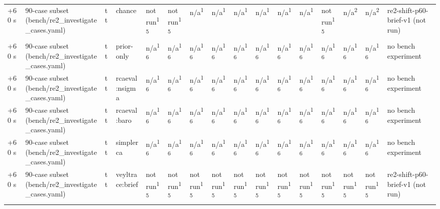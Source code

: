 \begin{table}[t]
\begin{tabular}{llllllllllllllll}
+60 s & 90-case subset (bench/re2\_investigate\_cases.yaml) & tt & chance & not run\textsuperscript{15} & not run\textsuperscript{15} & n/a\textsuperscript{1} & n/a\textsuperscript{1} & n/a\textsuperscript{1} & n/a\textsuperscript{1} & n/a\textsuperscript{1} & n/a\textsuperscript{1} & not run\textsuperscript{15} & n/a\textsuperscript{2} & n/a\textsuperscript{2} & re2-shift-p60-brief-v1 (not run) \\
+60 s & 90-case subset (bench/re2\_investigate\_cases.yaml) & tt & prior-only & n/a\textsuperscript{16} & n/a\textsuperscript{16} & n/a\textsuperscript{16} & n/a\textsuperscript{16} & n/a\textsuperscript{16} & n/a\textsuperscript{16} & n/a\textsuperscript{16} & n/a\textsuperscript{16} & n/a\textsuperscript{16} & n/a\textsuperscript{16} & n/a\textsuperscript{16} & no bench experiment \\
+60 s & 90-case subset (bench/re2\_investigate\_cases.yaml) & tt & rcaeval:nsigma & n/a\textsuperscript{16} & n/a\textsuperscript{16} & n/a\textsuperscript{16} & n/a\textsuperscript{16} & n/a\textsuperscript{16} & n/a\textsuperscript{16} & n/a\textsuperscript{16} & n/a\textsuperscript{16} & n/a\textsuperscript{16} & n/a\textsuperscript{16} & n/a\textsuperscript{16} & no bench experiment \\
+60 s & 90-case subset (bench/re2\_investigate\_cases.yaml) & tt & rcaeval:baro & n/a\textsuperscript{16} & n/a\textsuperscript{16} & n/a\textsuperscript{16} & n/a\textsuperscript{16} & n/a\textsuperscript{16} & n/a\textsuperscript{16} & n/a\textsuperscript{16} & n/a\textsuperscript{16} & n/a\textsuperscript{16} & n/a\textsuperscript{16} & n/a\textsuperscript{16} & no bench experiment \\
+60 s & 90-case subset (bench/re2\_investigate\_cases.yaml) & tt & simplerca & n/a\textsuperscript{16} & n/a\textsuperscript{16} & n/a\textsuperscript{16} & n/a\textsuperscript{16} & n/a\textsuperscript{16} & n/a\textsuperscript{16} & n/a\textsuperscript{16} & n/a\textsuperscript{16} & n/a\textsuperscript{16} & n/a\textsuperscript{16} & n/a\textsuperscript{16} & no bench experiment \\
+60 s & 90-case subset (bench/re2\_investigate\_cases.yaml) & tt & veyltrace:brief & not run\textsuperscript{15} & not run\textsuperscript{15} & not run\textsuperscript{15} & not run\textsuperscript{15} & not run\textsuperscript{15} & not run\textsuperscript{15} & not run\textsuperscript{15} & not run\textsuperscript{15} & not run\textsuperscript{15} & not run\textsuperscript{15} & not run\textsuperscript{15} & re2-shift-p60-brief-v1 (not run) \\

\end{tabular}
\end{table}
